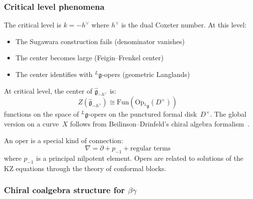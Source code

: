 \subsubsection{Critical level phenomena}

\begin{definition}\label{def:critical}
The critical level is $k = -h^\vee$ where $h^\vee$ is the dual Coxeter number. At this level:
\begin{itemize}
\item The Sugawara construction fails (denominator vanishes)
\item The center becomes large (Feigin--Frenkel center)
\item The center identifies with ${}^L\mathfrak{g}$-opers (geometric Langlands)
\end{itemize}
\end{definition}

\begin{theorem}\label{thm:ff-center}
At critical level, the center of $\widehat{\mathfrak{g}}_{-h^\vee}$ is:
\[
Z(\widehat{\mathfrak{g}}_{-h^\vee}) \cong \mathrm{Fun}(\mathrm{Op}_{{}^L\mathfrak{g}}(D^\times))
\]
functions on the space of ${}^L\mathfrak{g}$-opers on the punctured formal disk~$D^\times$. The global version on a curve~$X$ follows from Beilinson--Drinfeld's chiral algebra formalism~\cite{BD04}.
\end{theorem}

\begin{remark}
An oper is a special kind of connection:
\[
\nabla = \partial + p_{-1} + \text{regular terms}
\]
where $p_{-1}$ is a principal nilpotent element. Opers are related to solutions of the KZ equations through the theory of conformal blocks.
\end{remark}

\subsubsection{\texorpdfstring{Chiral coalgebra structure for $\beta\gamma$}{Chiral coalgebra structure for beta-gamma}}

